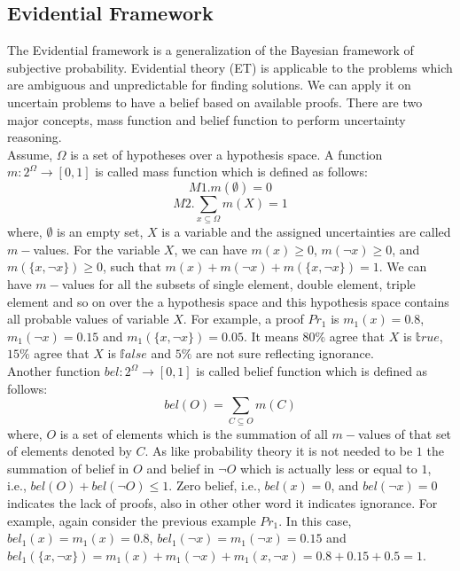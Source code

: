 \subsection{Evidential Framework}
The Evidential framework is a generalization of the Bayesian framework of subjective probability\cite{Chavez_Garcia_2016}. Evidential theory (ET) is applicable to the problems which are ambiguous and unpredictable for finding solutions. We can apply it on uncertain problems to have a belief based on available proofs. There are two major concepts, mass function and belief function to perform uncertainty reasoning\cite{Bell_4028391}.\\
Assume, $\Omega$ is a set of hypotheses over a hypothesis space. A function $m:2^\Omega \rightarrow[0, 1]$ is called mass function which is defined as follows\cite{Bell_4028391}:
$$M1. m(\emptyset)=0$$
$$M2.\sum_{x \subseteq \Omega} m(X) = 1$$
where, $\emptyset$ is an empty set, $X$ is a variable and the assigned uncertainties are called $m-$values\cite{srivastava2011introduction}. For the variable $X$, we can have $m(x) \geq 0$, $m(\neg x) \geq 0$, and $m(\{x,\neg x\}) \geq 0$, such that $m(x) + m(\neg x) + m(\{x,\neg x\}) = 1$\cite{srivastava2011introduction}. We can have $m-$values for all the subsets of single element, double element, triple element and so on over the a hypothesis space and this hypothesis space contains all probable values of variable $X$. For example, a proof $Pr_{1}$ is $m_{1}(x)=0.8$, $m_{1}(\neg x)=0.15$ and $m_{1}(\{x,\neg x\}) = 0.05$. It means $80\%$ agree that $X$ is $\mathbb true$, $15\%$ agree that $X$ is $\mathbb false$ and $5\%$ are not sure reflecting ignorance.\\
Another function $bel:2^\Omega \rightarrow[0, 1]$ is called belief function which is defined as follows\cite{srivastava2011introduction}:
$$bel(O) = \sum_{C \subseteq O} m(C)$$
where, $O$ is a set of elements which is the summation of all $m-$values of that set of elements denoted by $C$. As like probability theory it is not needed  to be $1$ the summation of belief in $O$ and belief in $\neg O$ which is actually less or equal to $1$, i.e., $bel(O) + bel(\neg O)\leq 1$\cite{srivastava2011introduction}. Zero belief, i.e., $bel(x) = 0$, and $bel(\neg x) = 0$ indicates the lack of proofs, also in other other word it indicates ignorance. For example, again consider the previous example $Pr_{1}$. In this case, $bel_{1}(x) = m_{1}(x) = 0.8$, $bel_{1}(\neg x) = m_{1}(\neg x) = 0.15$ and $bel_{1}(\{x, \neg x\}) = m_{1}(x) + m_{1}(\neg x) + m_{1}({x, \neg x}) = 0.8+0.15+0.5 = 1$.\\
